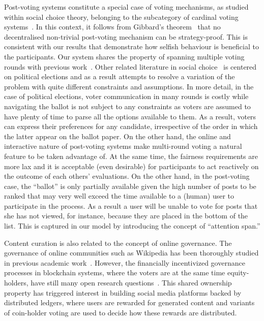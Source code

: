   Post-voting systems constitute a special case of voting mechanisms, as studied
  within social choice theory, belonging to the subcategory of cardinal voting
  systems~\cite{hillinger2005case}. In this context, it follows from Gibbard's
  theorem~\cite{gibbard1973manipulation} that no decentralised non-trivial
  post-voting mechanism can be strategy-proof. This is consistent with our
  results that demonstrate how selfish behaviour is beneficial to the
  participants. Our system shares the property of spanning multiple voting
  rounds with previous work~\cite{kalech2011practical}. Other related literature
  in social
  choice~\cite{lu2011robust,conitzer2005communication,xia2010compilation} is
  centered on political elections and as a result attempts to resolve a
  variation of the problem with quite different constraints and assumptions. In
  more detail, in the case of political elections, voter communication in many
  rounds is costly while navigating the ballot is not subject to any constraints
  as voters are assumed to have plenty of time to parse all the options
  available to them. As a result, voters can express their preferences for any
  candidate, irrespective of the order in which the latter appear on the ballot
  paper. On the other hand, the online and interactive nature of post-voting
  systems make multi-round voting a natural feature to be taken advantage of. At
  the same time, the fairness requirements are more lax and it is acceptable
  (even desirable) for participants to act reactively on the outcome of each
  others' evaluations. On the other hand, in the post-voting case, the
  ``ballot'' is only partially available given the high number of posts to be
  ranked that may very well exceed the time available to a (human) user to
  participate in the process. As a result a user will be unable to vote for
  posts that she has not viewed, for instance, because they are placed in the
  bottom of the list. This is captured in our model by introducing the concept
  of ``attention span.''

  Content curation is also related to the concept of online governance. The
  governance of online communities such as Wikipedia has been thoroughly studied
  in previous academic work~\cite{leskovec2010governance,forte2008scaling}.
  However, the financially incentivized governance processes in blockchain
  systems, where the voters are at the same time equity-holders, have still many
  open research questions~\cite{vitalik,ehrsam}. This shared ownership property
  has triggered interest in building social media platforms backed by
  distributed ledgers, where users are rewarded for generated content and
  variants of coin-holder voting are used to decide how these rewards are
  distributed.

